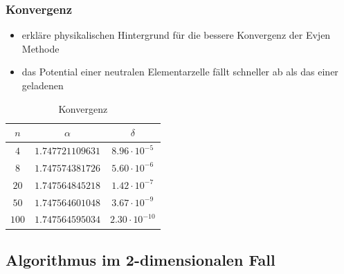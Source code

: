 \documentclass[10pt,a4paper]{article}
\begin{document}
\subsubsection{Konvergenz}

\begin{itemize}
\item erkläre physikalischen Hintergrund für die bessere Konvergenz der Evjen
Methode
\item das Potential einer neutralen Elementarzelle fällt schneller ab als das
einer geladenen
\end{itemize}

\begin{table}[h]
\centering
\begin{tabular}{c|c|c}
\rule[-1ex]{0pt}{2.5ex} $n$ & $\alpha$ & $\delta$ \\ 
\hline 
\rule[-1ex]{0pt}{2.5ex} $4$ & $1.747721109631$ & $8.96\cdot10^{-5}$ \\ 
\hline 
\rule[-1ex]{0pt}{2.5ex} $8$ & $1.747574381726$ & $5.60\cdot10^{-6}$ \\ 
\hline 
\rule[-1ex]{0pt}{2.5ex} $20$ & $1.747564845218$ & $1.42\cdot10^{-7}$ \\ 
\hline 
\rule[-1ex]{0pt}{2.5ex} $50$ & $1.747564601048$ & $3.67\cdot10^{-9}$ \\ 
\hline 
\rule[-1ex]{0pt}{2.5ex} $100$ & $1.747564595034$ & $2.30\cdot10^{-10}$ \\ 
\end{tabular} 
\caption{Konvergenz}
\end{table}

\subsection{Algorithmus im 2-dimensionalen Fall}
\end{document}
